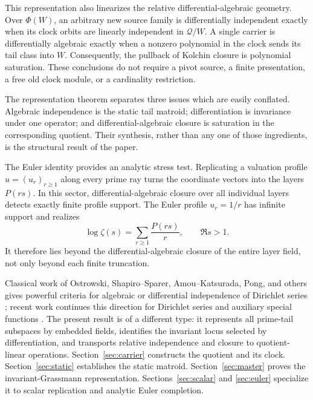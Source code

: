 \documentclass[11pt]{article}
\theoremstyle{definition}
\theoremstyle{remark}
\newcommand{\cQ}{\mathcal Q}
\begin{document}
This representation also linearizes the relative differential-algebraic geometry.  Over
\(\Phi(W)\), an arbitrary new source family is differentially independent exactly when its clock
orbits are linearly independent in \(\cQ/W\).  A single carrier is differentially algebraic
exactly when a nonzero polynomial in the clock sends its tail class into \(W\).  Consequently,
the pullback of Kolchin closure is polynomial saturation.  These conclusions do not require a
pivot source, a finite presentation, a free old clock module, or a cardinality restriction.

The representation theorem separates three issues which are easily conflated.  Algebraic
independence is the static tail matroid; differentiation is invariance under one operator; and
differential-algebraic closure is saturation in the corresponding quotient.  Their synthesis,
rather than any one of those ingredients, is the structural result of the paper.

The Euler identity provides an analytic stress test.  Replicating a valuation profile
\(u=(u_r)_{r\geq1}\) along every prime ray turns the coordinate vectors into the layers
\(P(rs)\).  In this sector, differential-algebraic closure over all individual layers detects
exactly finite profile support.  The Euler profile \(u_r=1/r\) has infinite support and realizes
\begin{equation}\label{eq:euler-intro}
  \log\zeta(s)=\sum_{r\geq1}\frac{P(rs)}{r},\qquad \Re s>1.
\end{equation}
It therefore lies beyond the differential-algebraic closure of the entire layer field, not only
beyond each finite truncation.

Classical work of Ostrowski, Shapiro--Sparer, Amou--Katsurada, Pong, and others gives powerful
criteria for algebraic or differential independence of Dirichlet series
\cite{Ostrowski,ShapiroSparer,AmouKatsurada,Pong,Nagoshi}; recent work continues this direction
for Dirichlet series and auxiliary special functions \cite{LuJiangLu}.  The present result is of
a different type: it represents all prime-tail subspaces by embedded fields, identifies the
invariant locus selected by differentiation, and transports relative independence and closure
to quotient-linear operations.  Section~\ref{sec:carrier} constructs the quotient and its clock.
Section~\ref{sec:static} establishes the static matroid.  Section~\ref{sec:master} proves the
invariant-Grassmann representation.  Sections~\ref{sec:scalar} and \ref{sec:euler} specialize it
to scalar replication and analytic Euler completion.
\end{document}
